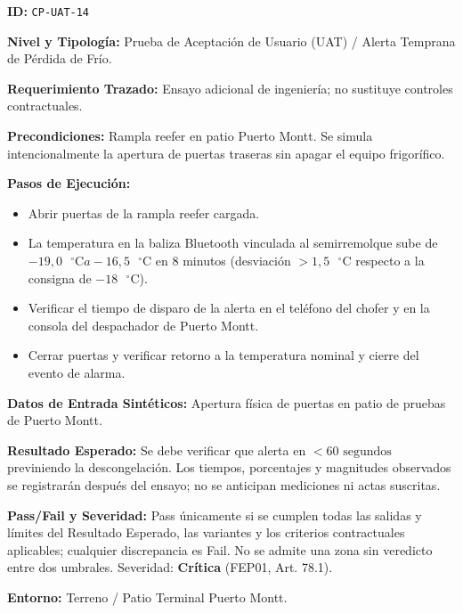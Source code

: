 \par\noindent\textbf{ID:} \texttt{CP-\allowbreak{}UAT-\allowbreak{}14}\par
\par\noindent\textbf{Nivel y Tipología:} Prueba de Aceptación de Usuario (UAT) / Alerta Temprana de Pérdida de Frío.\par
\par\noindent\textbf{Requerimiento Trazado:} Ensayo adicional de ingeniería; no sustituye controles contractuales.\par
\par\noindent\textbf{Precondiciones:} Rampla reefer en patio Puerto Montt. Se simula intencionalmente la apertura de puertas traseras sin apagar el equipo frigorífico.\par
\par\noindent\textbf{Pasos de Ejecución:}\par
\begin{itemize}
\item Abrir puertas de la rampla reefer cargada.
\item La temperatura en la baliza Bluetooth vinculada al semirremolque sube de \(-19{,}0\text{ }^\circ\text{C} a -16{,}5\text{ }^\circ\text{C}\) en 8 minutos (desviación \(> 1{,}5\text{ }^\circ\text{C}\) respecto a la consigna de \(-18\text{ }^\circ\text{C}\)).
\item Verificar el tiempo de disparo de la alerta en el teléfono del chofer y en la consola del despachador de Puerto Montt.
\item Cerrar puertas y verificar retorno a la temperatura nominal y cierre del evento de alarma.
\end{itemize}

\par\noindent\textbf{Datos de Entrada Sintéticos:} Apertura física de puertas en patio de pruebas de Puerto Montt.\par
\par\noindent\textbf{Resultado Esperado:} Se debe verificar que alerta en \(< 60\text{ segundos}\) previniendo la descongelación. Los tiempos, porcentajes y magnitudes observados se registrarán después del ensayo; no se anticipan mediciones ni actas suscritas.\par
\par\noindent\textbf{Pass/Fail y Severidad:} Pass únicamente si se cumplen todas las salidas y límites del Resultado Esperado, las variantes y los criterios contractuales aplicables; cualquier discrepancia es Fail. No se admite una zona sin veredicto entre dos umbrales. Severidad: \textbf{Crítica} (FEP01, Art. 78.1).\par
\par\noindent\textbf{Entorno:} Terreno / Patio Terminal Puerto Montt.\par


